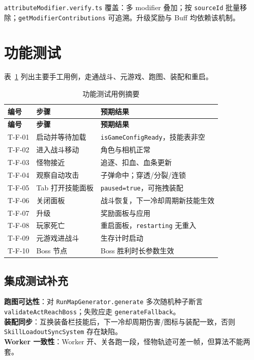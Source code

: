 \texttt{attributeModifier.verify.ts} 覆盖：多 modifier 叠加；按 \texttt{sourceId} 批量移除；\texttt{getModifierContributions} 可追溯。升级奖励与 Buff 均依赖该机制\cite{briand2001maintainability}。

\section{功能测试}

表~\ref{tab:test-func} 列出主要手工用例，走通战斗、元游戏、跑图、装配和重启。

\begin{longtable}{p{2.2cm}p{4.5cm}p{6.3cm}}
  \caption{功能测试用例摘要} \label{tab:test-func} \\
  \toprule
  \textbf{编号} & \textbf{步骤} & \textbf{预期结果} \\
  \midrule
  \endfirsthead
  \toprule
  \textbf{编号} & \textbf{步骤} & \textbf{预期结果} \\
  \midrule
  \endhead
  T-F-01 & 启动并等待加载 & \texttt{isGameConfigReady}，技能表非空 \\
  T-F-02 & 进入战斗移动 & 角色与相机正常 \\
  T-F-03 & 怪物接近 & 追逐、扣血、血条更新 \\
  T-F-04 & 观察自动攻击 & 子弹命中；穿透/分裂/连锁 \\
  T-F-05 & Tab 打开技能面板 & \texttt{paused=true}，可拖拽装配 \\
  T-F-06 & 关闭面板 & 战斗恢复，下一冷却周期新技能生效 \\
  T-F-07 & 升级 & 奖励面板与应用 \\
  T-F-08 & 玩家死亡 & 重启面板，\texttt{restarting} 无重入 \\
  T-F-09 & 元游戏进战斗 & 生存计时启动 \\
  T-F-10 & Boss 节点 & Boss 胜利时长参数生效 \\
  \bottomrule
\end{longtable}

\subsection{集成测试补充}

\textbf{跑图可达性}：对 \texttt{RunMapGenerator.generate} 多次随机种子断言 \texttt{validateActReachBoss}；失败应走 \texttt{generateFallback}。\\
\textbf{装配同步}：互换装备栏技能后，下一冷却周期伤害/图标与装配一致，否则 \texttt{SkillLoadoutSyncSystem} 存在缺陷。\\
\textbf{Worker 一致性}：Worker 开、关各跑一段，怪物轨迹可差一帧，但算法不能两套\cite{mckenzie2008crowd}。

